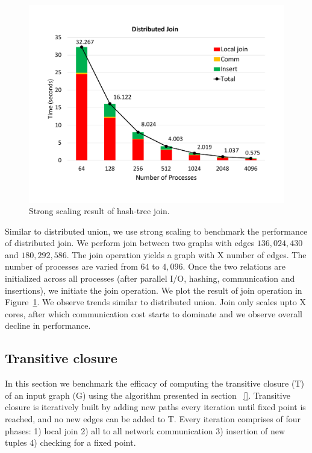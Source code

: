 \begin{figure}[h]
	\includegraphics[width=\columnwidth]{results/join.pdf}
	\caption{Strong scaling result of hash-tree join.}
	\label{fig:dist_join}
\end{figure}



Similar to distributed union, we use strong scaling to benchmark the performance of distributed join.
We perform join between two graphs with edges $136,024,430$ and $180,292,586$. The join operation yields a graph with X number of edges.
The number of processes are varied from $64$ to $4,096$. 
Once the two relations are initialized across all processes (after parallel I/O, hashing, communication and insertions), we initiate the join operation. 
We plot the result of join operation in Figure~\ref{fig:dist_join}. We observe trends similar to distributed union.
Join only scales upto X cores, after which communication cost starts to dominate and we observe overall decline in performance.


\subsection{Transitive closure}
\label{sec:tc}

In this section we benchmark the efficacy of computing the transitive closure (T) of an input graph (G) using the algorithm presented in section ~\ref{}.
Transitive closure is iteratively built by adding new paths every iteration until fixed point is reached, and no new edges can be added to T.
Every iteration comprises of four phases: 1) local join 2) all to all network communication 3) insertion of new tuples 4) checking for a
fixed point.

